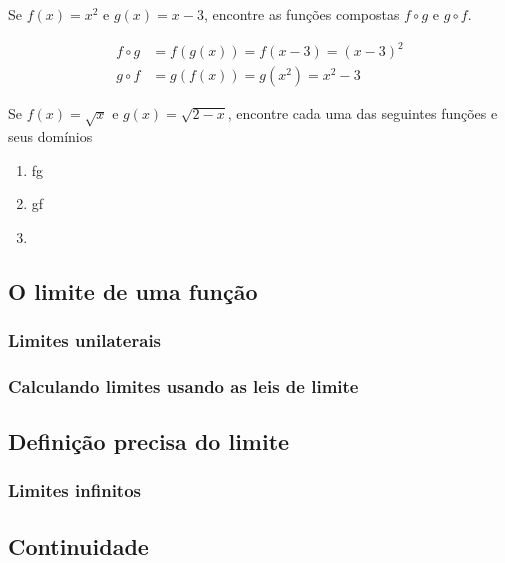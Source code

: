  Se $f(x) = x^2$ e $g(x) = x-3$, encontre as funções compostas $f\circ g$ e $g\circ f$.

\solution $$\begin{aligned}
	f\circ g &= f(g(x)) = f(x-3) = (x-3)^2\\
	g\circ f &= g(f(x)) = g(x^2) = x^2-3
\end{aligned}$$

\exampleEnd

 Se $f(x)= \sqrt{x}$ e $g(x) = \sqrt{2-x}$, encontre cada uma das seguintes funções e seus domínios
\begin{enumerate}
	\item f\circ g
	\item g\circ f
	\item 
\end{enumerate}


\subsection{O limite de uma função}

\subsubsection{Limites unilaterais}

\subsubsection{Calculando limites usando as leis de limite}

\subsection{Definição precisa do limite}
\subsubsection{Limites infinitos}
\subsection{Continuidade}

